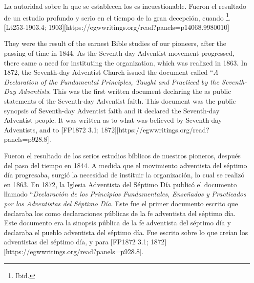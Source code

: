 La autoridad sobre la que se establecen los  es incuestionable. Fueron el resultado de un estudio profundo y serio en el tiempo de la gran decepción, cuando \footnote{Ibid.}. [Lt253-1903.4; 1903][https://egwwritings.org/read?panels=p14068.9980010]


They were the result of the earnest Bible studies of our pioneers, after the passing of time in 1844. As the Seventh-day Adventist movement progressed, there came a need for instituting the organization, which was realized in 1863. In 1872, the Seventh-day Adventist Church issued the document called “\textit{A Declaration of the Fundamental Principles, Taught and Practiced by the Seventh-Day Adventists}. This was the first written document declaring the  as public statements of the Seventh-day Adventist faith. This document was the public synopsis of Seventh-day Adventist faith and it declared  the Seventh-day Adventist people. It was written  as to what was believed by Seventh-day Adventists,  and to [FP1872 3.1; 1872][https://egwwritings.org/read?panels=p928.8].


Fueron el resultado de los serios estudios bíblicos de nuestros pioneros, después del paso del tiempo en 1844. A medida que el movimiento adventista del séptimo día progresaba, surgió la necesidad de instituir la organización, lo cual se realizó en 1863. En 1872, la Iglesia Adventista del Séptimo Día publicó el documento llamado “\textit{Declaración de los Principios Fundamentales, Enseñados y Practicados por los Adventistas del Séptimo Día}. Este fue el primer documento escrito que declaraba los  como declaraciones públicas de la fe adventista del séptimo día. Este documento era la sinopsis pública de la fe adventista del séptimo día y declaraba  el pueblo adventista del séptimo día. Fue escrito  sobre lo que creían los adventistas del séptimo día,  y para [FP1872 3.1; 1872][https://egwwritings.org/read?panels=p928.8].


